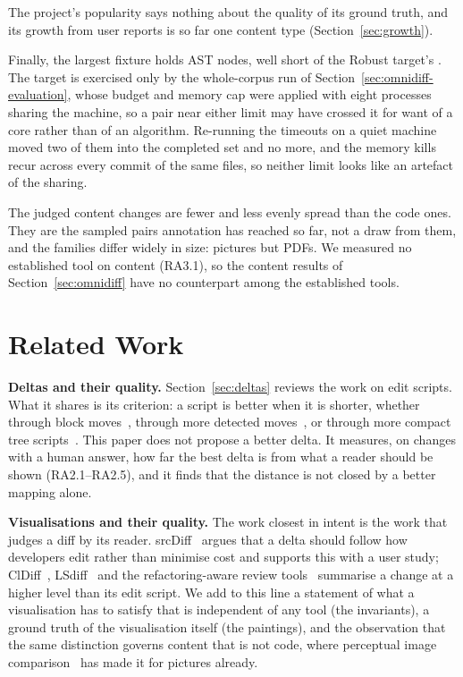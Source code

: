 \documentclass[sigconf,review]{acmart}
\begin{document}
The project's popularity says nothing about the quality of its ground truth, and its growth from
user reports is so far one content type (Section~\ref{sec:growth}).

Finally, the largest fixture holds \RobustnessMaxNodes{} AST nodes, well short of the Robust
target's \AstMax{}. The target is exercised only by the whole-corpus run of
Section~\ref{sec:omnidiff-evaluation}, whose budget and memory cap were applied with eight
processes sharing the machine, so a pair near either limit may have crossed it for want of a core
rather than of an algorithm. Re-running the timeouts on a quiet machine moved two of them into the
completed set and no more, and the memory kills recur across every commit of the same files, so
neither limit looks like an artefact of the sharing.

The judged content changes are fewer and less evenly spread than the code ones. They are the
sampled pairs annotation has reached so far, not a draw from them, and the families differ widely
in size: \ContentAccPicturesJudged{} pictures but \ContentAccPdfsJudged{} PDFs. We measured no
established tool on content (RA3.1), so the content results of Section~\ref{sec:omnidiff} have
no counterpart among the established tools.

\section{Related Work}
\label{sec:related}

\textbf{Deltas and their quality.} Section~\ref{sec:deltas} reviews the work on edit scripts.
What it shares is its criterion: a script is better when it is shorter, whether through block
moves~\cite{tichy-1984}, through more detected moves~\cite{mtdiff-2016}, or through more
compact tree scripts~\cite{ijm-2018,matsumoto-2019,falleri-2024}. This paper does not propose a better delta.
It measures, on changes with a human answer, how far the best delta is from what a reader should
be shown (RA2.1--RA2.5), and it finds that the distance is not closed by a better mapping alone.

\textbf{Visualisations and their quality.} The work closest in intent is the work that judges a
diff by its reader. srcDiff~\cite{decker-2020} argues that a delta should follow how developers
edit rather than minimise cost and supports this with a user study; ClDiff~\cite{cldiff-2018},
LSdiff~\cite{kim-notkin-2009} and the refactoring-aware review
tools~\cite{ge-2017,brito-2021,refactoringminer-2022} summarise a change at a higher level than
its edit script. We add to this line a statement of what a visualisation has to satisfy that is
independent of any tool (the invariants), a ground truth of the visualisation itself (the
paintings), and the observation that the same distinction governs content that is not code,
where perceptual image comparison~\cite{ssim-2004,yee-2004} has made it for pictures already.
\end{document}
